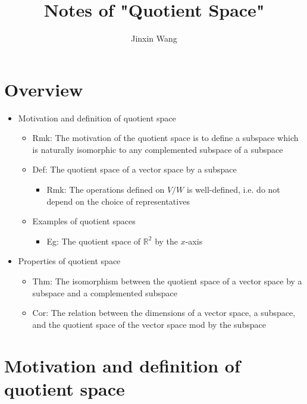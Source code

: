 \documentclass[onecolumn]{ctexart}
\title{Notes of "Quotient Space"}
\author{Jinxin Wang}
\date{}
\begin{document}
\maketitle

\section{Overview}
\begin{itemize}
  \item Motivation and definition of quotient space
  \begin{itemize}
    \item Rmk: The motivation of the quotient space is to define a subspace which is naturally isomorphic to any complemented subspace of a subspace
    \item Def: The quotient space of a vector space by a subspace
    \begin{itemize}
      \item Rmk: The operations defined on $V \slash W$ is well-defined, i.e. do not depend on the choice of representatives
    \end{itemize}
    \item Examples of quotient spaces
    \begin{itemize}
      \item Eg: The quotient space of $\mathbb{R}^2$ by the $x$-axis
    \end{itemize}
  \end{itemize}
  \item Properties of quotient space
  \begin{itemize}
    \item Thm: The isomorphism between the quotient space of a vector space by a subspace and a complemented subspace
    \item Cor: The relation between the dimensions of a vector space, a subspace, and the quotient space of the vector space mod by the subspace
  \end{itemize}
\end{itemize}

\section{Motivation and definition of quotient space}
\end{document}
